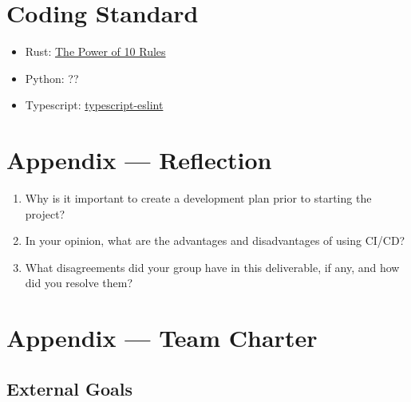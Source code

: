 \documentclass{article}
\begin{document}
\section{Coding Standard}

\begin{itemize}
  \item Rust:
        \href{https://en.wikipedia.org/wiki/The_Power_of_10:_Rules_for_Developing_Safety-Critical_Code}{The
          Power of 10 Rules}
  \item Python: ??
  \item Typescript:
        \href{https://typescript-eslint.io/packages/typescript-eslint}{typescript-eslint}

\end{itemize}


\newpage{}

\section*{Appendix --- Reflection}




\begin{enumerate}
  \item Why is it important to create a development plan prior to starting the project?
  \item In your opinion, what are the advantages and disadvantages of using CI/CD?
  \item What disagreements did your group have in this deliverable, if any, and how did
        you resolve them?
\end{enumerate}

\newpage{}

\section*{Appendix --- Team Charter}


\subsection*{External Goals}

\end{document}
